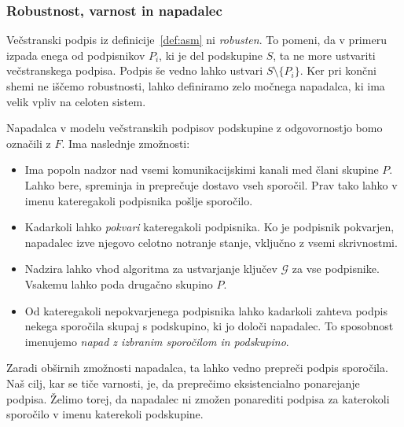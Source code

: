 \subsubsection{Robustnost, varnost in napadalec}
Večstranski podpis iz definicije~\ref{def:asm} ni \textit{robusten}. To pomeni, da v primeru izpada
enega od podpisnikov $P_i$, ki je del podskupine $S$, ta ne more ustvariti večstranskega podpisa.
Podpis še vedno lahko ustvari $S \setminus \{P_i\}$. Ker pri končni shemi ne iščemo robustnosti,
lahko definiramo zelo močnega napadalca, ki ima velik vpliv na celoten sistem.
\begin{definicija}
\label{def:asm-napadalec}
    Napadalca v modelu večstranskih podpisov podskupine z odgovornostjo bomo označili z $F$. Ima
    naslednje zmožnosti:
    \begin{itemize}
        \item Ima popoln nadzor nad vsemi komunikacijskimi kanali med člani skupine $P$. Lahko bere,
            spreminja in preprečuje dostavo vseh sporočil. Prav tako lahko v imenu kateregakoli
            podpisnika pošlje sporočilo.
        \item Kadarkoli lahko \textit{pokvari} kateregakoli podpisnika. Ko je podpisnik pokvarjen,
            napadalec izve njegovo celotno notranje stanje, vključno z vsemi skrivnostmi.
        \item Nadzira lahko vhod algoritma za ustvarjanje ključev $\mathcal{G}$ za vse podpisnike.
            Vsakemu lahko poda drugačno skupino $P$.
        \item Od kateregakoli nepokvarjenega podpisnika lahko kadarkoli zahteva podpis nekega sporočila
            skupaj s podskupino, ki jo določi napadalec. To sposobnost imenujemo
            \textit{napad z izbranim sporočilom in podskupino}.
    \end{itemize}
\end{definicija}

Zaradi obširnih zmožnosti napadalca, ta lahko vedno prepreči podpis sporočila. Naš cilj, kar se
tiče varnosti, je, da preprečimo eksistencialno ponarejanje podpisa. Želimo torej, da napadalec ni
zmožen ponarediti podpisa za katerokoli sporočilo v imenu katerekoli podskupine.

